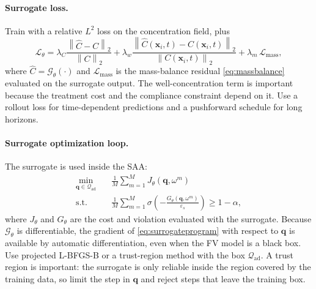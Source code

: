 \documentclass[11pt]{article}
\numberwithin{equation}{section}
\newcommand{\norm}[1]{\left\lVert #1 \right\rVert}
\newcommand{\xx}{\mathbf{x}}
\theoremstyle{plain}
\begin{document}
\paragraph{Surrogate loss.}
Train with a relative $L^2$ loss on the concentration field, plus
\begin{equation}
\label{eq:surrogateloss}
\mathcal{L}_\theta
=\lambda_C\frac{\norm{\hat C-C}_2}{\norm{C}_2}
+\lambda_w\frac{\norm{\hat C(\xx_i,t)-C(\xx_i,t)}_2}
 {\norm{C(\xx_i,t)}_2}
+\lambda_m\,\mathcal{L}_{\mathrm{mass}},
\end{equation}
where $\hat C=\mathcal{G}_\theta(\cdot)$ and $\mathcal{L}_{\mathrm{mass}}$ is
the mass-balance residual \eqref{eq:massbalance} evaluated on the surrogate
output.  The well-concentration term is important because the treatment cost
and the compliance constraint depend on it.  Use a rollout loss for
time-dependent predictions and a pushforward schedule for long horizons.

\paragraph{Surrogate optimization loop.}
The surrogate is used inside the SAA:
\begin{equation}
\label{eq:surrogateprogram}
\begin{aligned}
\min_{\mathbf{q}\in\mathcal{Q}_{\mathrm{ad}}}\quad
& \frac{1}{M}\sum_{m=1}^{M}J_\theta(\mathbf{q},\omega^m)\\
\text{s.t.}\quad
& \frac{1}{M}\sum_{m=1}^{M}
 \sigma\!\left(-\frac{G_\theta(\mathbf{q},\omega^m)}{\varepsilon_s}\right)
 \ge1-\alpha,
\end{aligned}
\end{equation}
where $J_\theta$ and $G_\theta$ are the cost and violation evaluated with the
surrogate.  Because $\mathcal{G}_\theta$ is differentiable, the gradient of
\eqref{eq:surrogateprogram} with respect to $\mathbf{q}$ is available by
automatic differentiation, even when the FV model is a black box.  Use
projected L-BFGS-B or a trust-region method with the box
$\mathcal{Q}_{\mathrm{ad}}$.  A trust region is important: the surrogate is
only reliable inside the region covered by the training data, so limit the
step in $\mathbf{q}$ and reject steps that leave the training box.
\end{document}
